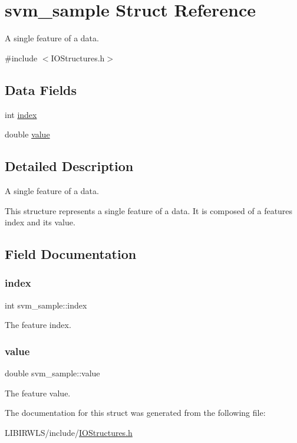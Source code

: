 \hypertarget{structsvm__sample}{}\section{svm\+\_\+sample Struct Reference}
\label{structsvm__sample}


A single feature of a data.  




{\ttfamily \#include $<$I\+O\+Structures.\+h$>$}

\subsection*{Data Fields}
\begin{DoxyCompactItemize}
\item 
int \hyperlink{structsvm__sample_a008f6b24c7c76af103e84245fb271506}{index}
\item 
double \hyperlink{structsvm__sample_a2c43371736dc33a9e1d83561a99cf2f7}{value}
\end{DoxyCompactItemize}


\subsection{Detailed Description}
A single feature of a data. 

This structure represents a single feature of a data. It is composed of a features index and its value. 

\subsection{Field Documentation}
\hypertarget{structsvm__sample_a008f6b24c7c76af103e84245fb271506}{}\label{structsvm__sample_a008f6b24c7c76af103e84245fb271506} 
\subsubsection{\texorpdfstring{index}{index}}
{\ttfamily int svm\+\_\+sample\+::index}

The feature index. \hypertarget{structsvm__sample_a2c43371736dc33a9e1d83561a99cf2f7}{}\label{structsvm__sample_a2c43371736dc33a9e1d83561a99cf2f7} 
\subsubsection{\texorpdfstring{value}{value}}
{\ttfamily double svm\+\_\+sample\+::value}

The feature value. 

The documentation for this struct was generated from the following file\+:\begin{DoxyCompactItemize}
\item 
L\+I\+B\+I\+R\+W\+L\+S/include/\hyperlink{IOStructures_8h}{I\+O\+Structures.\+h}\end{DoxyCompactItemize}
